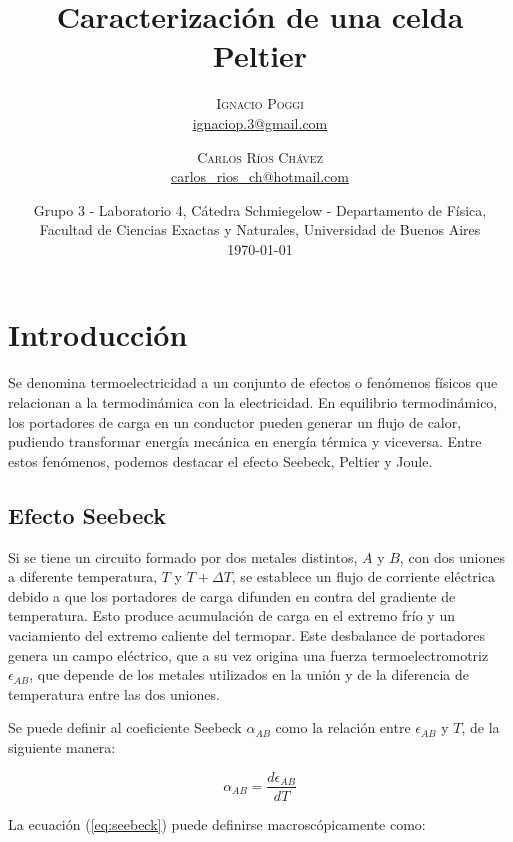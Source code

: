 \documentclass[twoside,twocolumn,a4paper]{article}
\title{Caracterizaci\'on de una celda Peltier} %
\author{%
\textsc{Ignacio Poggi} \\[1ex] %
\normalsize \href{mailto:ignaciop.3@gmail.com}{ignaciop.3@gmail.com} %
\and %
\textsc{Carlos R\'ios Ch\'avez} \\[1ex] %
\normalsize \href{mailto:carlos_rios_ch@hotmail.com}{carlos\_rios\_ch@hotmail.com} %
}
\date{Grupo 3 - Laboratorio 4, C\'atedra Schmiegelow - Departamento de F\'isica, Facultad de Ciencias Exactas y Naturales, Universidad de Buenos Aires \newline \\ \today} %
\begin{document}
\maketitle



\section{Introducci\'on}


Se denomina termoelectricidad a un conjunto de efectos o fen\'omenos f\'isicos que relacionan a la termodin\'amica con la electricidad. En equilibrio termodin\'amico, los portadores de carga en un conductor pueden generar un flujo de calor, pudiendo transformar energ\'ia mec\'anica en energ\'ia t\'ermica y viceversa. Entre estos fen\'omenos, podemos destacar el efecto Seebeck, Peltier y Joule.

\subsection{Efecto Seebeck}

Si se tiene un circuito formado por dos metales distintos, $A$ y $B$, con dos uniones a diferente temperatura, $T$ y $T + \Delta T$, se establece un flujo de corriente el\'ectrica debido a que los portadores de carga difunden en contra del gradiente de temperatura. Esto produce acumulaci\'on de carga en el extremo fr\'io y un vaciamiento del extremo caliente del termopar. Este desbalance de portadores genera un campo el\'ectrico, que a su vez origina una fuerza termoelectromotriz $\epsilon_{AB}$, que depende de los metales utilizados en la uni\'on y de la diferencia de temperatura entre las dos uniones.\newline

\par
Se puede definir al coeficiente Seebeck $\alpha_{AB}$ como la relaci\'on entre $\epsilon_{AB}$ y $T$, de la siguiente manera:

\begin{equation}
\label{eq:seebeck}
\alpha_{AB} = \frac{d\epsilon_{AB}}{dT}
\end{equation}

La ecuaci\'on (\ref{eq:seebeck}) puede definirse macrosc\'opicamente como:
\end{document}
